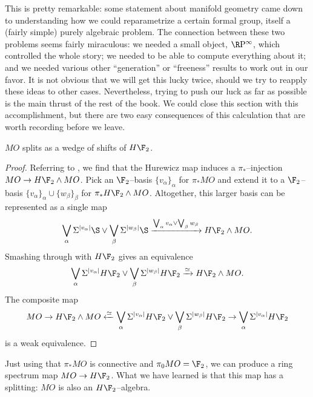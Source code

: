 This is pretty remarkable: some statement about manifold geometry came down to understanding how we could reparametrize a certain formal group, itself a (fairly simple) purely algebraic problem.  The connection between these two problems seems fairly miraculous: we needed a small object, $\RP^\infty$, which controlled the whole story; we needed to be able to compute everything about it; and we needed various other ``generation'' or ``freeness'' results to work out in our favor.  It is not obvious that we will get this lucky twice, should we try to reapply these ideas to other cases.  Nevertheless, trying to push our luck as far as possible is the main thrust of the rest of the book.  We could close this section with this accomplishment, but there are two easy consequences of this calculation that are worth recording before we leave.

\begin{lemma}\label{MOSplitsIntoHF2s}
$MO$ splits as a wedge of shifts of $H\F_2$.
\end{lemma}
\begin{proof}
Referring to , we find that the Hurewicz map induces a $\pi_*$--injection $MO \to H\F_2 \sm MO$.  Pick an $\F_2$--basis $\{v_\alpha\}_\alpha$ for $\pi_* MO$ and extend it to a $\F_2$--basis $\{v_\alpha\}_\alpha \cup \{w_\beta\}_\beta$ for $\pi_* H\F_2 \sm MO$.  Altogether, this larger basis can be represented as a single map \[\bigvee_\alpha \Susp^{|v_\alpha|} \S \vee \bigvee_\beta \Susp^{|w_\beta|} \S \xrightarrow{\bigvee_\alpha v_\alpha \vee \bigvee_\beta w_\beta} H\F_2 \sm MO.\]  Smashing through with $H\F_2$ gives an equivalence \[\bigvee_\alpha \Susp^{|v_\alpha|} H\F_2 \vee \bigvee_\beta \Susp^{|w_\beta|} H\F_2 \xrightarrow\simeq H\F_2 \sm MO.\]  The composite map \[MO \to H\F_2 \sm MO \xleftarrow\simeq \bigvee_\alpha \Susp^{|v_\alpha|} H\F_2 \vee \bigvee_\beta \Susp^{|w_\beta|} H\F_2 \to \bigvee_\alpha \Susp^{|v_\alpha|} H\F_2\] is a weak equivalence.
\end{proof}

\begin{remark}
Just using that $\pi_* MO$ is connective and $\pi_0 MO = \F_2$, we can produce a ring spectrum map $MO \to H\F_2$.  What we have learned is that this map has a splitting: $MO$ is also an $H\F_2$--algebra.
\end{remark}

